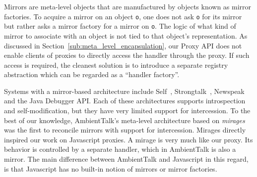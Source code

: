 \documentclass{sig-alternate}
\begin{document}
Mirrors are meta-level objects that are manufactured by objects known as mirror factories. To acquire a mirror on an object \texttt{o}, one does not ask \texttt{o} for its mirror but rather asks a mirror factory for a mirror on \texttt{o}. The logic of what kind of mirror to associate with an object is not tied to that object's representation. As discussed in Section~\ref{sub:meta_level_encapsulation}, our Proxy API does not enable clients of proxies to directly access the handler through the proxy. If such access is required, the cleanest solution is to introduce a separate registry abstraction which can be regarded as a ``handler factory''.

Systems with a mirror-based architecture include Self~\cite{ungar87power}, Strongtalk~\cite{bracha93strongtalk}, Newspeak~\cite{bracha10newspeak} and the Java Debugger API. Each of these architectures supports introspection and self-modification, but they have very limited support for intercession. To the best of our knowledge, AmbientTalk's meta-level architecture based on \emph{mirages}~\cite{mostinckx07behavioral} was the first to reconcile mirrors with support for intercession. Mirages directly inspired our work on Javascript proxies. A mirage is very much like our proxy. Its behavior is controlled by a separate handler, which in AmbientTalk is also a mirror. The main difference between AmbientTalk and Javascript in this regard, is that Javascript has no built-in notion of mirrors or mirror factories.




\end{document}
